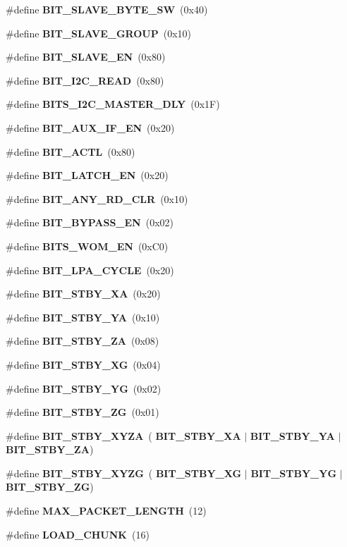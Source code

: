 \begin{DoxyCompactItemize}
\item 
\#define \textbf{ B\+I\+T\+\_\+\+S\+L\+A\+V\+E\+\_\+\+B\+Y\+T\+E\+\_\+\+SW}~(0x40)
\item 
\#define \textbf{ B\+I\+T\+\_\+\+S\+L\+A\+V\+E\+\_\+\+G\+R\+O\+UP}~(0x10)
\item 
\#define \textbf{ B\+I\+T\+\_\+\+S\+L\+A\+V\+E\+\_\+\+EN}~(0x80)
\item 
\#define \textbf{ B\+I\+T\+\_\+\+I2\+C\+\_\+\+R\+E\+AD}~(0x80)
\item 
\#define \textbf{ B\+I\+T\+S\+\_\+\+I2\+C\+\_\+\+M\+A\+S\+T\+E\+R\+\_\+\+D\+LY}~(0x1\+F)
\item 
\#define \textbf{ B\+I\+T\+\_\+\+A\+U\+X\+\_\+\+I\+F\+\_\+\+EN}~(0x20)
\item 
\#define \textbf{ B\+I\+T\+\_\+\+A\+C\+TL}~(0x80)
\item 
\#define \textbf{ B\+I\+T\+\_\+\+L\+A\+T\+C\+H\+\_\+\+EN}~(0x20)
\item 
\#define \textbf{ B\+I\+T\+\_\+\+A\+N\+Y\+\_\+\+R\+D\+\_\+\+C\+LR}~(0x10)
\item 
\#define \textbf{ B\+I\+T\+\_\+\+B\+Y\+P\+A\+S\+S\+\_\+\+EN}~(0x02)
\item 
\#define \textbf{ B\+I\+T\+S\+\_\+\+W\+O\+M\+\_\+\+EN}~(0x\+C0)
\item 
\#define \textbf{ B\+I\+T\+\_\+\+L\+P\+A\+\_\+\+C\+Y\+C\+LE}~(0x20)
\item 
\#define \textbf{ B\+I\+T\+\_\+\+S\+T\+B\+Y\+\_\+\+XA}~(0x20)
\item 
\#define \textbf{ B\+I\+T\+\_\+\+S\+T\+B\+Y\+\_\+\+YA}~(0x10)
\item 
\#define \textbf{ B\+I\+T\+\_\+\+S\+T\+B\+Y\+\_\+\+ZA}~(0x08)
\item 
\#define \textbf{ B\+I\+T\+\_\+\+S\+T\+B\+Y\+\_\+\+XG}~(0x04)
\item 
\#define \textbf{ B\+I\+T\+\_\+\+S\+T\+B\+Y\+\_\+\+YG}~(0x02)
\item 
\#define \textbf{ B\+I\+T\+\_\+\+S\+T\+B\+Y\+\_\+\+ZG}~(0x01)
\item 
\#define \textbf{ B\+I\+T\+\_\+\+S\+T\+B\+Y\+\_\+\+X\+Y\+ZA}~(\textbf{ B\+I\+T\+\_\+\+S\+T\+B\+Y\+\_\+\+XA} $\vert$ \textbf{ B\+I\+T\+\_\+\+S\+T\+B\+Y\+\_\+\+YA} $\vert$ \textbf{ B\+I\+T\+\_\+\+S\+T\+B\+Y\+\_\+\+ZA})
\item 
\#define \textbf{ B\+I\+T\+\_\+\+S\+T\+B\+Y\+\_\+\+X\+Y\+ZG}~(\textbf{ B\+I\+T\+\_\+\+S\+T\+B\+Y\+\_\+\+XG} $\vert$ \textbf{ B\+I\+T\+\_\+\+S\+T\+B\+Y\+\_\+\+YG} $\vert$ \textbf{ B\+I\+T\+\_\+\+S\+T\+B\+Y\+\_\+\+ZG})
\item 
\#define \textbf{ M\+A\+X\+\_\+\+P\+A\+C\+K\+E\+T\+\_\+\+L\+E\+N\+G\+TH}~(12)
\item 
\#define \textbf{ L\+O\+A\+D\+\_\+\+C\+H\+U\+NK}~(16)
\end{DoxyCompactItemize}
